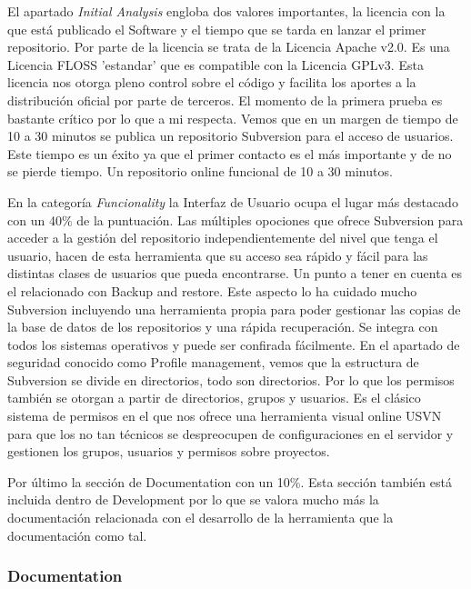 \documentclass[11pt]{scrartcl}
\begin{document}
\par El apartado \emph{Initial Analysis} engloba dos valores importantes, la licencia con la que está publicado el Software y el tiempo que se tarda en lanzar el primer repositorio. Por parte de la licencia se trata de la Licencia Apache v2.0. Es una Licencia FLOSS 'estandar' que es compatible con la Licencia GPLv3. Esta licencia nos otorga pleno control sobre el c\'odigo y facilita los aportes a la distribuci\'on oficial por parte de terceros.
El momento de la primera prueba es bastante cr\'itico por lo que a mi respecta. Vemos que en un margen de tiempo de 10 a 30 minutos se publica un repositorio Subversion para el acceso de usuarios. Este tiempo es un \'exito ya que el primer contacto es el m\'as importante y de no se pierde tiempo. Un repositorio online funcional de 10 a 30 minutos.

\par En la categor\'ia \emph{Funcionality} la Interfaz de Usuario ocupa el lugar m\'as destacado con un 40\% de la puntuaci\'on. Las m\'ultiples opociones que ofrece Subversion para acceder a la gesti\'on del repositorio independientemente del nivel que tenga el usuario, hacen de esta herramienta que su acceso sea r\'apido y f\'acil para las distintas clases de usuarios que pueda encontrarse.
Un punto a tener en cuenta es el relacionado con Backup and restore. Este aspecto lo ha cuidado mucho Subversion incluyendo una herramienta propia para poder gestionar las copias de la base de datos de los repositorios y una r\'apida recuperaci\'on. Se integra con todos los sistemas operativos y puede ser confirada f\'acilmente. 
En el apartado de seguridad conocido como Profile management, vemos que la estructura de Subversion se divide en directorios, todo son directorios. Por lo que los permisos tambi\'en se otorgan a partir de directorios, grupos y usuarios. Es el cl\'asico sistema de permisos en el que nos ofrece una herramienta visual online USVN para que los no tan t\'ecnicos se despreocupen de configuraciones en el servidor y gestionen los grupos, usuarios y permisos sobre proyectos.

\par Por \'ultimo la secci\'on de Documentation con un 10\%. Esta secci\'on tambi\'en est\'a incluida dentro de Development por lo que se valora mucho m\'as la documentaci\'on relacionada con el desarrollo de la herramienta que la documentaci\'on como tal.

\subsubsection{Documentation}
\end{document}
